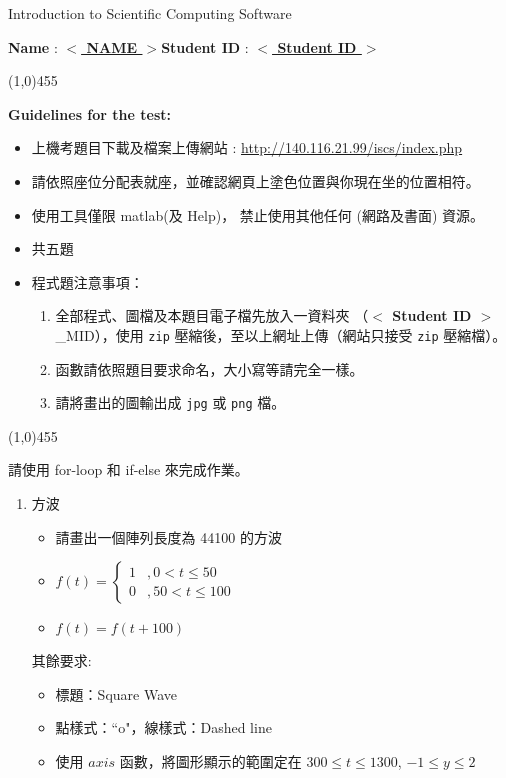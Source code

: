 \documentclass[12pt,a4paper,fontset = none]{article}
\newcommand{\placeholder}[1]{\textbf{$<$ #1 $>$}}
\newcommand{\idnumber}{\placeholder{Student ID}}
\newcommand{\name}{\placeholder{NAME}}
\begin{document}
\begin{center}{\large Introduction to Scientific Computing Software}\end{center}

\begin{center}\textbf{Name} : \underline{ \name{}}\qquad\qquad\qquad\textbf{Student ID} : \underline{ \idnumber{}}\end{center}

\begin{center}
\line(1,0){455}
\end{center}
\textbf{Guidelines for the test:}
\begin{itemize}
\item 上機考題目下載及檔案上傳網站 : \url{http://140.116.21.99/iscs/index.php}
\item 請依照座位分配表就座，並確認網頁上塗色位置與你現在坐的位置相符。
\item 使用工具僅限 matlab(及 Help)， 禁止使用其他任何 (網路及書面) 資源。
\item 共五題
\item 程式題注意事項：
\begin{enumerate}
\item 全部程式、圖檔及本題目電子檔先放入一資料夾 （\idnumber{}\_MID），使用 \texttt{zip} 壓縮後，至以上網址上傳（網站只接受 \texttt{zip} 壓縮檔）。
\item 函數請依照題目要求命名，大小寫等請完全一樣。
\item 請將畫出的圖輸出成 \texttt{jpg} 或 \texttt{png} 檔。
\end{enumerate}
\end{itemize}
\begin{center}
\line(1,0){455}
\end{center}
請使用 for-loop 和 if-else 來完成作業。
\begin{enumerate}
\item 方波
\begin{itemize} 
\item 請畫出一個陣列長度為 44100 的方波

\item $f(t)=\left\{\begin{array}{lc}1&,0 < t\le50 \\ 0 &,50 < t \le 100\end{array}\right.$
\item $f(t)=f(t+100)$
\end{itemize}
其餘要求:
\begin{itemize}
\item 標題：Square Wave
\item 點樣式：``o"，線樣式：Dashed line
\item 使用 $axis$ 函數，將圖形顯示的範圍定在 $300 \le t \le 1300$, $-1\le y \le 2$
\end{itemize}
\end{enumerate}
\end{document}

